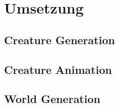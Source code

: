 \chapter{Umsetzung}
\label{Technische_Umsetzung}

\section{Creature Generation}


\section{Creature Animation}


\section{World Generation}

